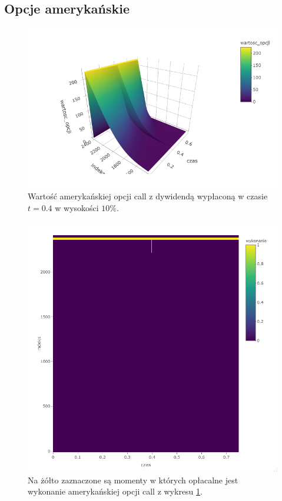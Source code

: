 \documentclass[12pt]{article}
\begin{document}
\subsection{Opcje amerykańskie}

\begin{figure}[H]
    \centering
    \includegraphics[width=\textwidth,height=\textheight,keepaspectratio]{dividend/call_A_dywidenda.png}
    \caption{Wartość amerykańskiej opcji call z dywidendą wypłaconą w czasie $t = 0.4$ w wysokości $10\%$.}
    \label{fig:divi_call_A}
\end{figure}



\begin{figure}[H]
    \centering
    \includegraphics[width=\textwidth,height=\textheight,keepaspectratio]{dividend/wykonanie_call.png}
    \caption{Na żółto zaznaczone są momenty w których opłacalne jest wykonanie amerykańskiej opcji call z wykresu \ref{fig:divi_call_A}.}
    \label{fig:wykonanie_call}
\end{figure}
\end{document}
